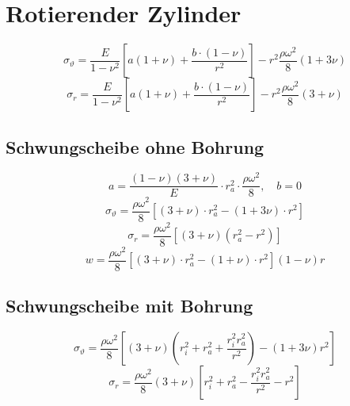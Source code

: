 \section{Rotierender Zylinder} %
	\begin{equation*}
		\sigma_\vartheta = \frac{E}{1-\nu^2}\left[ a(1+\nu) + \frac{b \cdot (1-\nu)}{r^2}\right] - r^2 \frac{\rho \omega^2}{8}(1+3\nu)
	\end{equation*}
	\begin{equation*}
		\sigma_r = \frac{E}{1-\nu^2}\left[ a(1+\nu) + \frac{b \cdot (1-\nu)}{r^2}\right] - r^2 \frac{\rho \omega^2}{8}(3+\nu)
	\end{equation*}
	
	\subsection{Schwungscheibe ohne Bohrung} %
		\begin{equation*}
			a = \frac{(1-\nu)(3+\nu)}{E}\cdot r_a^2\cdot \frac{\rho\omega^2}{8}, \quad b=0
		\end{equation*}
		\begin{equation*}
			\sigma_\vartheta = \frac{\rho \omega^2}{8}\left[ (3+\nu)\cdot r_a^2 - (1+3\nu)\cdot r^2\right]
		\end{equation*}
		\begin{equation*}
			\sigma_r = \frac{\rho \omega^2}{8} \left[ (3+\nu)(r_a^2 - r^2)\right]
		\end{equation*}
		\begin{equation*}
			w = \frac{\rho \omega^2}{8}\left[ (3+\nu)\cdot r_a^2 - (1+\nu)\cdot r^2\right](1-\nu)r
		\end{equation*}
	\subsection{Schwungscheibe mit Bohrung} %
		\begin{equation*}
			\sigma_\vartheta = \frac{\rho \omega^2}{8} \left[ (3+\nu)\left( r_i^2 +r_a^2 + \frac{r_i^2 r_a^2}{r^2}\right) - (1 + 3\nu)r^2\right]
		\end{equation*}
		\begin{equation*}
			\sigma_r =  \frac{\rho \omega^2}{8} (3+\nu) \left[ r_i^2 + r_a^2 - \frac{r_i^2r_a^2}{r^2} - r^2\right]
		\end{equation*}
